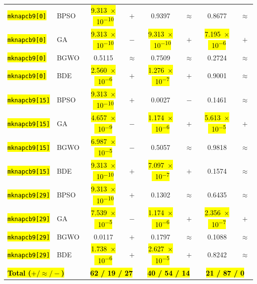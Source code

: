 \documentclass[mathematics,article,accept,moreauthors]{Definitions/mdpi}
\begin{document}
\begin{table}[H]
\begin{tabularx}{\textwidth}{Xlcccccc}
    \texttt{\hl{mknapcb9[0]}} & BPSO  & \hl{9.313~$\times$~10\textsuperscript{$-$10}} & $+$ &    0.9397 & $\approx$ &    0.8677 & $\approx$ \\
    \texttt{\hl{mknapcb9[0]}} & GA    & \hl{9.313~$\times$~10\textsuperscript{$-$10}} & $-$ & \hl{9.313~$\times$~10\textsuperscript{$-$10}} & $+$ & \hl{7.195~$\times$~10\textsuperscript{$-$6}} & $+$ \\
    \texttt{\hl{mknapcb9[0]}} & BGWO  &    0.5115 & $\approx$ &    0.7509 & $\approx$ &    0.2724 & $\approx$ \\
    \texttt{\hl{mknapcb9[0]}} & BDE   & \hl{2.560~$\times$~10\textsuperscript{$-$6}} & $+$ & \hl{1.276~$\times$~10\textsuperscript{$-$7}} & $+$ &    0.9001 & $\approx$ \\
    \midrule
    \texttt{\hl{mknapcb9[15]}} & BPSO  & \hl{9.313~$\times$~10\textsuperscript{$-$10}} & $+$ &    0.0027 & $-$ &    0.1461 & $\approx$ \\
    \texttt{\hl{mknapcb9[15]}} & GA    & \hl{4.657~$\times$~10\textsuperscript{$-$9}} & $-$ & \hl{1.174~$\times$~10\textsuperscript{$-$6}} & $+$ & \hl{5.613~$\times$~10\textsuperscript{$-$5}} & $+$ \\
    \texttt{\hl{mknapcb9[15]}} & BGWO  & \hl{6.987~$\times$~10\textsuperscript{$-$5}} & $-$ &    0.5057 & $\approx$ &    0.9818 & $\approx$ \\
    \texttt{\hl{mknapcb9[15]}} & BDE   & \hl{9.313~$\times$~10\textsuperscript{$-$10}} & $+$ & \hl{7.097~$\times$~10\textsuperscript{$-$7}} & $+$ &    0.1574 & $\approx$ \\
    \midrule
    \texttt{\hl{mknapcb9[29]}} & BPSO  & \hl{9.313~$\times$~10\textsuperscript{$-$10}} & $+$ &    0.1302 & $\approx$ &    0.6435 & $\approx$ \\
    \texttt{\hl{mknapcb9[29]}} & GA    & \hl{7.539~$\times$~10\textsuperscript{$-$5}} & $-$ & \hl{1.174~$\times$~10\textsuperscript{$-$6}} & $+$ & \hl{2.356~$\times$~10\textsuperscript{$-$7}} & $+$ \\
    \texttt{\hl{mknapcb9[29]}} & BGWO  &    0.0117 & $+$ &    0.1797 & $\approx$ &    0.1088 & $\approx$ \\
    \texttt{\hl{mknapcb9[29]}} & BDE   & \hl{1.738~$\times$~10\textsuperscript{$-$6}} & $+$ & \hl{2.627~$\times$~10\textsuperscript{$-$5}} & $+$ &    0.8242 & $\approx$ \\
    \midrule
    \multicolumn{2}{l}{\textbf{\hl{Total ($+ / \approx / -$)}}} & \multicolumn{2}{c}{\textbf{\hl{62 / 19 / 27}}}  & \multicolumn{2}{c}{\textbf{\hl{40 / 54 / 14}}}  & \multicolumn{2}{c}{\textbf{\hl{21 / 87 / 0}}} \\
    \bottomrule
  \end{tabularx}
\end{table}
\end{document}
